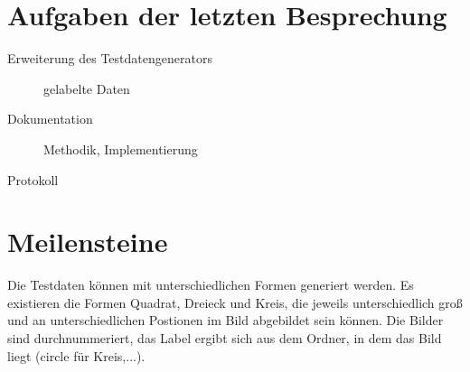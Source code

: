 
\newcommand{\Titel}{5. Protokoll}
\newcommand{\Teilnehmer}{Jonas Bürgel, Patrick Welter}
\newcommand{\DatumUndZeit}{13.12.2021 20:00-20:15}
\newcommand{\Ort}{Discord Meeting}
\newcommand{\Thema}{Erweiterung GAN: gelabelte Daten}


\section{Aufgaben der letzten Besprechung}
\begin{description}
	\item[Erweiterung des Testdatengenerators] gelabelte Daten  \fullcheck
	\item[Dokumentation] Methodik, Implementierung  \halfcheck
	\item[Protokoll]  \fullcheck
\end{description}

\section{Meilensteine}
\begin{description}[style=nextline]
	\item[Gelabelte Testdaten \hfill \fullcheck]
	Die Testdaten können mit unterschiedlichen Formen generiert werden.
	Es existieren die Formen Quadrat, Dreieck und Kreis, die jeweils unterschiedlich groß und an unterschiedlichen Postionen im Bild abgebildet sein können.
	Die Bilder sind durchnummeriert, das Label ergibt sich aus dem Ordner, in dem das Bild liegt (circle für Kreis,...).
\end{description}

